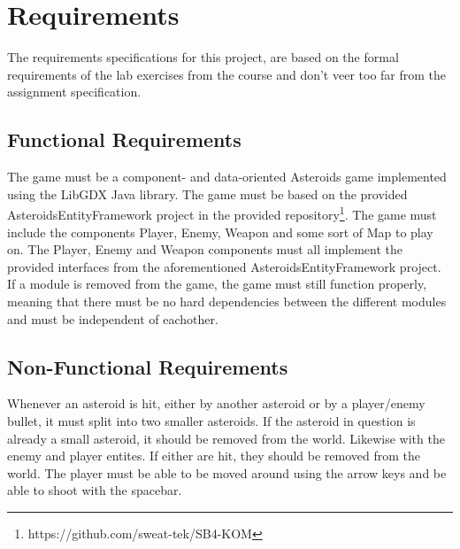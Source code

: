 \section{Requirements}
The requirements specifications for this project, are based on the formal requirements of the lab exercises from the course and don't veer too far from the assignment specification.

\subsection{Functional Requirements}
The game must be a component- and data-oriented Asteroids game implemented using
the LibGDX Java library. The game must be based on the provided
AsteroidsEntityFramework project in the provided repository\footnote{https://github.com/sweat-tek/SB4-KOM}.
The game must include the components Player, Enemy, Weapon and some sort of Map to play on. The Player, Enemy and
Weapon components must all implement the provided interfaces from the
aforementioned AsteroidsEntityFramework project. If a module is removed from the
game, the game must still function properly, meaning that there must be no hard
dependencies between the different modules and must be independent of eachother.

\subsection{Non-Functional Requirements}
Whenever an asteroid is hit, either by another asteroid or by a player/enemy
bullet, it must split into two smaller asteroids. If the asteroid in question is
already a small asteroid, it should be removed from the world. Likewise with the
enemy and player entites. If either are hit, they should be removed from the
world. The player must be able to be moved around using the arrow keys and be
able to shoot with the spacebar.